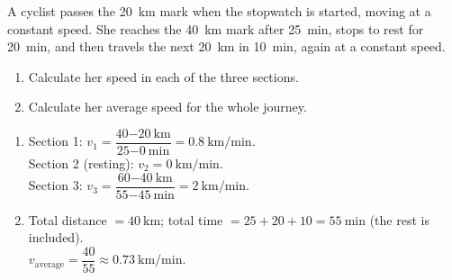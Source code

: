 \begin{exercise}
    A cyclist passes the \qty{20}{\km} mark when the stopwatch is started, moving at a constant speed. She reaches the \qty{40}{\km} mark after \qty{25}{\minute}, stops to rest for \qty{20}{\minute}, and then travels the next \qty{20}{\km} in \qty{10}{\minute}, again at a constant speed.
    \begin{enumerate}[label=\letraminuscula]
        \item Calculate her speed in each of the three sections.
        \item Calculate her average speed for the whole journey.
    \end{enumerate}
    \begin{solu}
        \begin{enumerate}[label=\alph*)]
            \item Section 1: \(v_1 = \dfrac{40\qty{-20}{\km}}{25\qty{-0}{\minute}} = \qty{0.8}{\km\per\minute}\). \\
            Section 2 (resting): \(v_2 = \qty{0}{\km\per\minute}\). \\
            Section 3: \(v_3 = \dfrac{60\qty{-40}{\km}}{55\qty{-45}{\minute}} = \qty{2}{\km\per\minute}\).
            \item Total distance \(= \qty{40}{\km}\); total time \(= 25 + 20 + 10 = \qty{55}{\minute}\) (the rest is included). \\
            \(v_{\text{average}} = \dfrac{40}{55} \approx \qty{0.73}{\km\per\minute}\).
        \end{enumerate}
    \end{solu}
\end{exercise}

